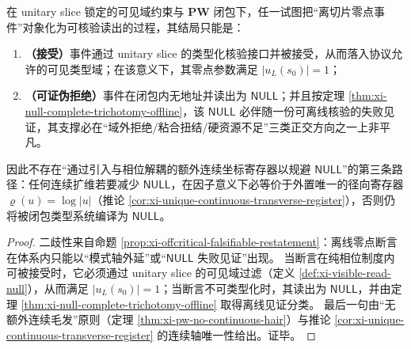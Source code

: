 \begin{corollary}\label{cor:xi-offcritical-dichotomy-acceptable-or-null}
在 unitary slice 锁定的可见域约束与 \(\mathbf{PW}\) 闭包下，任一试图把“离切片零点事件”对象化为可核验读出的过程，其结局只能是：
\begin{enumerate}
  \item \textbf{（接受）}事件通过 unitary slice 的类型化核验接口并被接受，从而落入协议允许的可见类型域；在该意义下，其零点参数满足 \(|u_L(s_0)|=1\)；
  \item \textbf{（可证伪拒绝）}事件在闭包内无地址并读出为 \(\mathsf{NULL}\)；并且按定理 \ref{thm:xi-null-complete-trichotomy-offline}，该 \(\mathsf{NULL}\) 必伴随一份可离线核验的失败见证，其支撑必在“域外拒绝/粘合扭结/硬资源不足”三类正交方向之一上非平凡。
\end{enumerate}
因此不存在“通过引入与相位解耦的额外连续坐标寄存器以规避 \(\mathsf{NULL}\)”的第三条路径：任何连续扩维若要减少 \(\mathsf{NULL}\)，在因子意义下必等价于外置唯一的径向寄存器 \(\varrho(u)=\log|u|\)（推论 \ref{cor:xi-unique-continuous-transverse-register}），否则仍将被闭包类型系统编译为 \(\mathsf{NULL}\)。
\end{corollary}

\begin{proof}
二歧性来自命题 \ref{prop:xi-offcritical-falsifiable-restatement}：离线零点断言在体系内只能以“模式轴外延”或“\(\mathsf{NULL}\) 失败见证”出现。
当断言在纯相位制度内可被接受时，它必须通过 unitary slice 的可见域过滤（定义 \ref{def:xi-visible-read-null}），从而满足 \(|u_L(s_0)|=1\)；当断言不可类型化时，其读出为 \(\mathsf{NULL}\)，并由定理 \ref{thm:xi-null-complete-trichotomy-offline} 取得离线见证分类。
最后一句由“无额外连续毛发”原则（定理 \ref{thm:xi-pw-no-continuous-hair}）与推论 \ref{cor:xi-unique-continuous-transverse-register} 的连续轴唯一性给出。证毕。
\end{proof}

